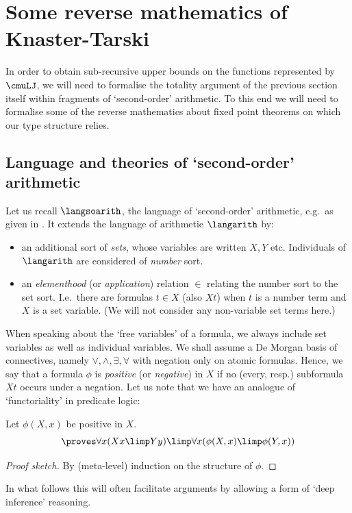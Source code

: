 \section{Some reverse mathematics of Knaster-Tarski}
\label{sec:rev-math-kt}
In order to obtain sub-recursive upper bounds on the functions represented by $\cmuLJ$, we will need to formalise the totality argument of the previous section itself within fragments of `second-order' arithmetic.
% 
To this end we will need to formalise some of the reverse mathematics about fixed point theorems on which our type structure relies.




\subsection{Language  and theories of `second-order' arithmetic}
Let us recall
$\langsoarith$, the language of `second-order' arithmetic, e.g.\ as given in \cite{Simpson99:monograph}.
It extends the language of arithmetic $\langarith$ by:
\begin{itemize}
    \item an additional sort of \emph{sets}, whose variables are written $X,Y $ etc. Individuals of $\langarith$ are considered of \emph{number} sort.
    \item an \emph{elementhood} (or \emph{application}) relation $\in$ relating the number sort to the set sort. I.e.\ there are formulas $t \in X$ (also $Xt$) when $t $ is a number term and $X$ is a set variable. (We will not consider any non-variable set terms here.)
\end{itemize}

When speaking about the `free variables' of a formula, we always include set variables as well as individual variables.
% 
We shall assume a De Morgan basis of connectives, namely $\lor, \land, \exists, \forall$ with negation only on atomic formulas.
Hence, we say that a formula $\phi$ is \emph{positive} (or \emph{negative}) in $X$ if no (every, resp.) subformula $Xt$ occurs under a negation.
Let us note that we have an analogue of `functoriality' in predicate logic:
\begin{lemma}[Monotonicity]
\label{lem:pos-imp-mon}
Let $\phi(X,x)$ be positive in $X$. 
\[
\proves \forall x (Xx \limp Yy) \limp \forall x (\phi(X,x) \limp \phi(Y,x))
\]
\end{lemma}
\begin{proof}[Proof sketch]
By (meta-level) induction on the structure of $\phi$.
\end{proof}
In what follows this will often facilitate arguments by allowing a form of `deep inference' reasoning.


